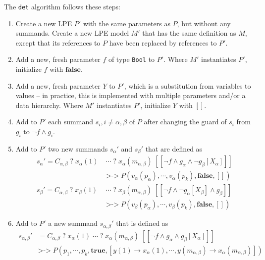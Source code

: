 The \texttt{det} algorithm follows these steps:

\begin{enumerate}
\item Create a new LPE $P'$ with the same parameters as $P$, but without any summands.
Create a new LPE model $M'$ that has the same definition as $M$, except that its references to $P$ have been replaced by references to $P'$.

\item Add a new, fresh parameter $f$ of type \texttt{Bool} to $P'$.
Where $M'$ instantiates $P'$, initialize $f$ with $\textbf{false}$.

\item Add a new, fresh parameter $Y$ to $P'$, which is a substitution from variables to values -- in practice, this is implemented with multiple parameters and/or a data hierarchy.
Where $M'$ instantiates $P'$, initialize $Y$ with $[]$.

\item Add to $P'$ each summand $s_i, i \neq \alpha, \beta$ of $P$ after changing the guard of $s_i$ from $g_i$ to $\neg f \land g_i$.

\item Add to $P'$ two new summands ${s_\alpha}'$ and ${s_\beta}'$ that are defined as
\begin{align*}
{s_\alpha}' = C_{\alpha,\beta} \; \texttt{?} \; x_\alpha(1) \; &\cdots{} \; \texttt{?} \; x_\alpha(m_{\alpha,\beta}) \; [[\neg f \land g_\alpha \land \neg g_\beta[X_\alpha]]] \\
&\texttt{>->} \; P(v_\alpha(p_\alpha), \cdots{}, v_\alpha(p_k), \textbf{false}, []) \\
{s_\beta}' = C_{\alpha,\beta} \; \texttt{?} \; x_\beta(1) \; &\cdots{} \; \texttt{?} \; x_\beta(m_{\alpha,\beta}) \; [[\neg f \land \neg g_\alpha[X_\beta] \land g_\beta]] \\
&\texttt{>->} \; P(v_\beta(p_\alpha), \cdots{}, v_\beta(p_k), \textbf{false}, [])
\end{align*}

\item Add to $P'$ a new summand ${s_{\alpha,\beta}}'$ that is defined as
\begin{align*}
{s_{\alpha,\beta}}' &= C_{\alpha,\beta} \; \texttt{?} \; x_\alpha(1) \; \cdots{} \; \texttt{?} \; x_\alpha(m_{\alpha,\beta}) \; [[\neg f \land g_\alpha \land g_\beta[X_\alpha]]] \\
&\texttt{>->} \; P(p_1, \cdots{}, p_k, \textbf{true}, [y(1) \rightarrow x_\alpha(1), \cdots{}, y(m_{\alpha,\beta}) \rightarrow x_\alpha(m_{\alpha,\beta})])
\end{align*}


\end{enumerate}
